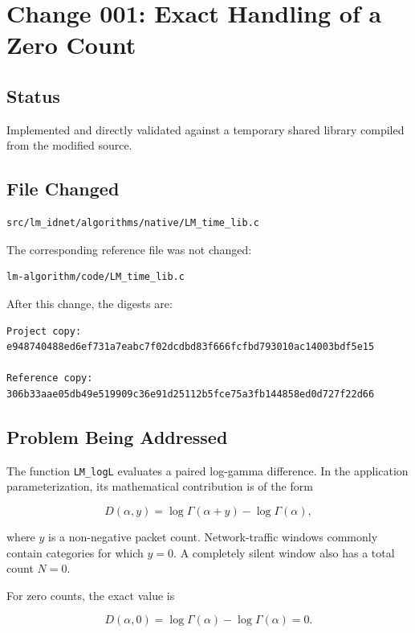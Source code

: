 \documentclass[11pt,a4paper]{article}
\begin{document}
\section{Change 001: Exact Handling of a Zero Count}

\subsection{Status}

Implemented and directly validated against a temporary shared library compiled
from the modified source.

\subsection{File Changed}

\begin{verbatim}
src/lm_idnet/algorithms/native/LM_time_lib.c
\end{verbatim}

The corresponding reference file was not changed:

\begin{verbatim}
lm-algorithm/code/LM_time_lib.c
\end{verbatim}

After this change, the digests are:

\begin{verbatim}
Project copy:
e948740488ed6ef731a7eabc7f02dcdbd83f666fcfbd793010ac14003bdf5e15

Reference copy:
306b33aae05db49e519909c36e91d25112b5fce75a3fb144858ed0d727f22d66
\end{verbatim}

\subsection{Problem Being Addressed}

The function \texttt{LM\_logL} evaluates a paired log-gamma difference. In the
application parameterization, its mathematical contribution is of the form

\[
D(\alpha,y)=\log\Gamma(\alpha+y)-\log\Gamma(\alpha),
\]

where \(y\) is a non-negative packet count. Network-traffic windows commonly
contain categories for which \(y=0\). A completely silent window also has a
total count \(N=0\).

For zero counts, the exact value is

\[
D(\alpha,0)
=\log\Gamma(\alpha)-\log\Gamma(\alpha)
=0.
\]
\end{document}
